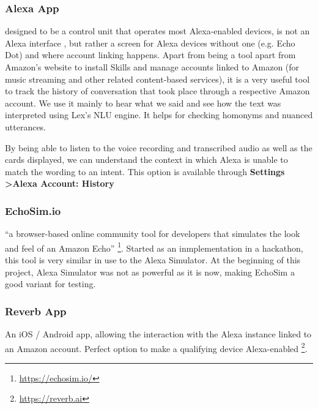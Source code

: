 	
\subsubsection*{Alexa App}
	designed to be a control unit that operates most Alexa-enabled devices, is not an Alexa interface%
	, but rather a screen for Alexa devices without one (e.g. Echo Dot) and where account linking happens. Apart from being a tool apart from Amazon's website to install Skills and manage accounts linked to Amazon (for music streaming and other related content-based services), it is a very useful tool to track the history of conversation that took place through a respective Amazon account. We use it mainly to hear what we said and see how the text was interpreted using Lex's NLU engine. It helps for checking homonyms and nuanced utterances.
	
	By being able to listen to the voice recording and transcribed audio as well as the cards displayed, we can understand the context in which Alexa is unable to match the wording to an intent. This option is available through \textbf{Settings \textgreater Alexa Account: History} 
	
	\subsubsection*{EchoSim.io}
	 ``a browser-based online community tool for developers that simulates the look and feel of an Amazon Echo'' \footnote{\url{https://echosim.io/}}. Started as an inmplementation in a hackathon, this tool is very similar in use to the Alexa Simulator. At the beginning of this project, Alexa Simulator was not as powerful as it is now, making EchoSim a good variant for testing. %
	
	\subsubsection*{Reverb App}
	An iOS / Android app, allowing the interaction with the Alexa instance linked to an Amazon account. Perfect option to make a qualifying device Alexa-enabled \footnote{\url{https://reverb.ai}}. 
	
